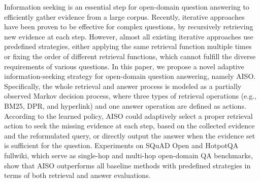 Information seeking is an essential step for open-domain question answering to efficiently gather evidence from a large corpus. Recently, iterative approaches have been proven to be effective for complex questions, by recursively retrieving new evidence at each step. However, almost all existing iterative approaches use predefined strategies, either applying the same retrieval function multiple times or fixing the order of different retrieval functions, which cannot fulfill the diverse requirements of various questions. In this paper, we propose a novel adaptive information-seeking strategy for open-domain question answering, namely AISO. Specifically, the whole retrieval and answer process is modeled as a partially observed Markov decision process, where three types of retrieval operations (e.g., BM25, DPR, and hyperlink) and one answer operation are defined as actions. According to the learned policy, AISO could adaptively select a proper retrieval action to seek the missing evidence at each step, based on the collected evidence and the reformulated query, or directly output the answer when the evidence set is sufficient for the question. Experiments on SQuAD Open and HotpotQA fullwiki, which serve as single-hop and multi-hop open-domain QA benchmarks, show that AISO outperforms all baseline methods with predefined strategies in terms of both retrieval and answer evaluations.
